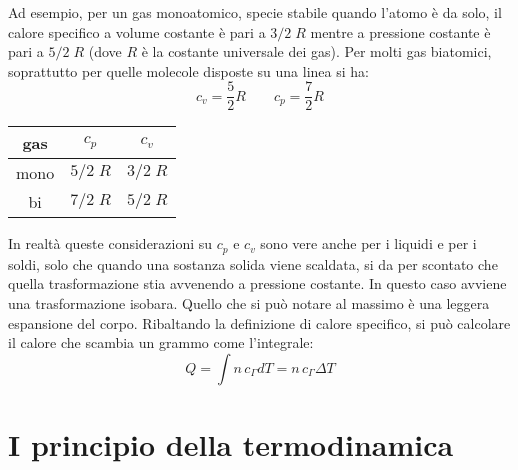 \documentclass[10pt,a4paper]{book}
\begin{document}
Ad esempio, per un gas monoatomico, specie stabile quando l'atomo è da solo, il calore specifico a volume costante è pari a $3/2\;R$ mentre a pressione costante è pari a $5/2\;R$ (dove $R$ è la costante universale dei gas). Per molti gas biatomici, soprattutto per quelle molecole disposte su una linea si ha:
\[
	c_v = \frac{5}{2}R \qquad c_p = \frac{7}{2}R
\]
\begin{table}[htpb]
	\centering
	\begin{tabular}{|c|c|c|}
		\hline
		gas & $c_p$ & $c_v$ \\
		\hline
		mono & $5/2 \;R$ & $3/2 \;R$ \\
		\hline
		bi & $7/2 \;R$ & $5/2 \;R$ \\
		\hline
	\end{tabular}
\end{table}
In realtà queste considerazioni su $c_p$ e $c_v$ sono vere anche per i liquidi e per i soldi, solo che quando una sostanza solida viene scaldata, si da per scontato che quella trasformazione stia avvenendo a pressione costante. In questo caso avviene una trasformazione isobara. Quello che si può notare al massimo è una leggera espansione del corpo. Ribaltando la definizione di calore specifico, si può calcolare il calore che scambia un grammo come l'integrale:
\[
	Q=\int n\,c_{\Gamma}dT = n\,c_{\Gamma}\Delta T
\]







































\section{I principio della termodinamica}
\end{document}
